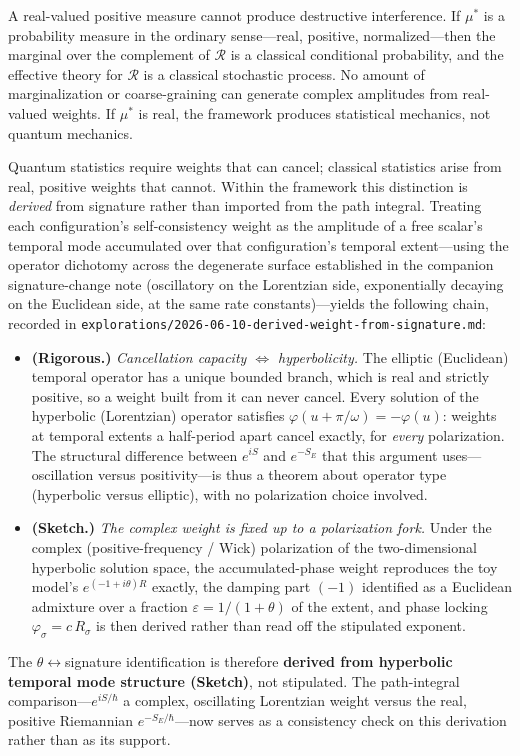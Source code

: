 \documentclass[12pt,a4paper]{article}
\theoremstyle{definition}
\theoremstyle{remark}
\begin{document}
A real-valued positive measure cannot produce destructive interference.
If $\mu^*$ is a probability measure in the ordinary sense---real,
positive, normalized---then the marginal over the complement of
$\mathcal{R}$ is a classical conditional probability, and the effective
theory for $\mathcal{R}$ is a classical stochastic process. No amount
of marginalization or coarse-graining can generate complex amplitudes
from real-valued weights. If $\mu^*$ is real, the framework produces
statistical mechanics, not quantum mechanics.

Quantum statistics require weights that can cancel; classical statistics
arise from real, positive weights that cannot. Within the framework this
distinction is \emph{derived} from signature rather than imported from the
path integral. Treating each configuration's self-consistency weight as
the amplitude of a free scalar's temporal mode accumulated over that
configuration's temporal extent---using the operator dichotomy across the
degenerate surface established in the companion signature-change note
(oscillatory on the Lorentzian side, exponentially decaying on the
Euclidean side, at the same rate constants)---yields the following chain,
recorded in
\texttt{explorations/2026-06-10-derived-weight-from-signature.md}:
\begin{itemize}
\item \textbf{(Rigorous.)} \emph{Cancellation capacity
$\Leftrightarrow$ hyperbolicity.} The elliptic (Euclidean) temporal
operator has a unique bounded branch, which is real and strictly
positive, so a weight built from it can never cancel. Every solution of
the hyperbolic (Lorentzian) operator satisfies
$\varphi(u + \pi/\omega) = -\varphi(u)$: weights at temporal extents a
half-period apart cancel exactly, for \emph{every} polarization. The
structural difference between $e^{iS}$ and $e^{-S_E}$ that this argument
uses---oscillation versus positivity---is thus a theorem about operator
type (hyperbolic versus elliptic), with no polarization choice involved.
\item \textbf{(Sketch.)} \emph{The complex weight is fixed up to a
polarization fork.} Under the complex (positive-frequency / Wick)
polarization of the two-dimensional hyperbolic solution space, the
accumulated-phase weight reproduces the toy model's $e^{(-1+i\theta)R}$
exactly, the damping part $(-1)$ identified as a Euclidean admixture over
a fraction $\varepsilon = 1/(1+\theta)$ of the extent, and phase locking
$\varphi_\sigma = c\,R_\sigma$ is then derived rather than read off the
stipulated exponent.
\end{itemize}
The $\theta\leftrightarrow$signature identification is therefore
\textbf{derived from hyperbolic temporal mode structure (Sketch)}, not
stipulated. The path-integral comparison---$e^{iS/\hbar}$ a complex,
oscillating Lorentzian weight versus the real, positive Riemannian
$e^{-S_E/\hbar}$---now serves as a consistency check on this derivation
rather than as its support.
\end{document}
